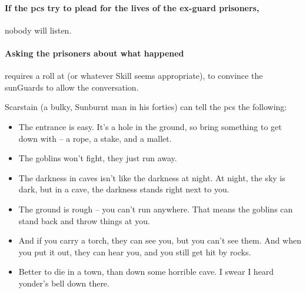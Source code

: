 \begin{multicols}{2}
\paragraph{If the \glspl{pc} try to plead for the lives of the ex-\gls{guard} prisoners,}
nobody will listen.


\paragraph{Asking the prisoners about what happened}
requires a  roll at \tn[8] (or whatever Skill seems appropriate), to convince the \glspl{sunGuard} to allow the conversation.

Scarstain (a bulky, Sunburnt man in his forties) can tell the \glspl{pc} the following:

\begin{itemize}
  \item
  The entrance is easy.
  It's a hole in the ground, so bring something to get down with -- a rope, a stake, and a mallet.
  \item
  The goblins won't fight, they just run away.
  \item
  The darkness in caves isn't like the darkness at night.
  At night, the sky is dark, but in a cave, the darkness stands right next to you.
  \item
  The ground is rough -- you can't run anywhere.
  That means the goblins can stand back and throw things at you.
  \item
  And if you carry a torch, they can see you, but you can't see them.
  And when you put it out, they can hear you, and you still get hit by rocks.
  \item
  Better to die in a town, than down some horrible cave.
  I swear I heard \gls{yonder}'s bell down there.
\end{itemize}



\end{multicols}
